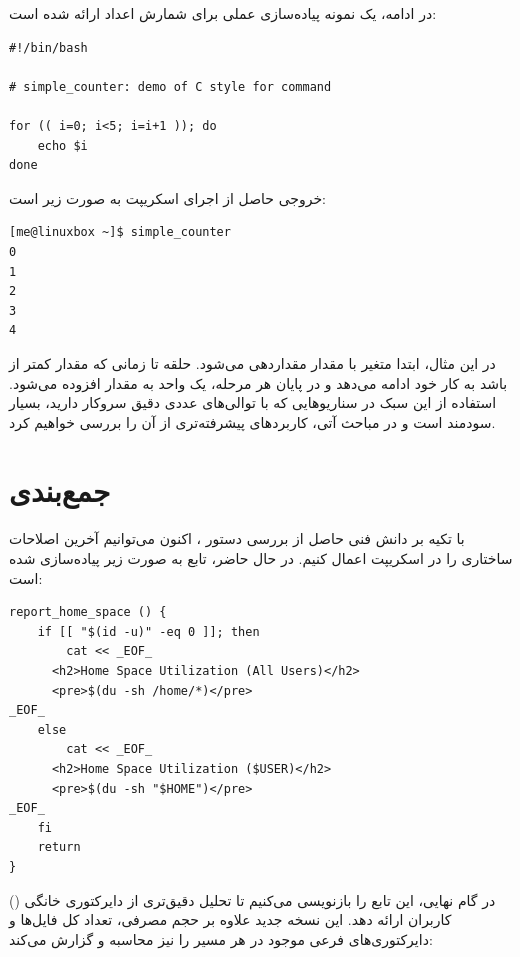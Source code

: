 در ادامه، یک نمونه پیاده‌سازی عملی برای شمارش اعداد ارائه شده است:

\begin{latin}
\begin{lstlisting}
#!/bin/bash

# simple_counter: demo of C style for command

for (( i=0; i<5; i=i+1 )); do
    echo $i
done
\end{lstlisting}
\end{latin}

خروجی حاصل از اجرای اسکریپت به صورت زیر است:

\begin{latin}
\begin{lstlisting}
[me@linuxbox ~]$ simple_counter
0
1
2
3
4
\end{lstlisting}
\end{latin}

در این مثال، ابتدا متغیر  با مقدار  مقداردهی می‌شود. حلقه تا زمانی که مقدار  کمتر از  باشد به کار خود ادامه می‌دهد و در پایان هر مرحله، یک واحد به مقدار  افزوده می‌شود. استفاده از این سبک در سناریوهایی که با توالی‌های عددی دقیق سروکار دارید، بسیار سودمند است و در مباحث آتی، کاربردهای پیشرفته‌تری از آن را بررسی خواهیم کرد.

\section{جمع‌بندی}

با تکیه بر دانش فنی حاصل از بررسی دستور ، اکنون می‌توانیم آخرین اصلاحات ساختاری را در اسکریپت  اعمال کنیم. در حال حاضر، تابع  به صورت زیر پیاده‌سازی شده است:

\begin{latin}
\begin{lstlisting}
report_home_space () {
    if [[ "$(id -u)" -eq 0 ]]; then
        cat << _EOF_
      <h2>Home Space Utilization (All Users)</h2>
      <pre>$(du -sh /home/*)</pre>
_EOF_
    else
        cat << _EOF_
      <h2>Home Space Utilization ($USER)</h2>
      <pre>$(du -sh "$HOME")</pre>
_EOF_
    fi
    return
}
\end{lstlisting}
\end{latin}

در گام نهایی، این تابع را بازنویسی می‌کنیم تا تحلیل دقیق‌تری از دایرکتوری خانگی () کاربران ارائه دهد. این نسخه جدید علاوه بر حجم مصرفی، تعداد کل فایل‌ها و دایرکتوری‌های فرعی موجود در هر مسیر را نیز محاسبه و گزارش می‌کند:

